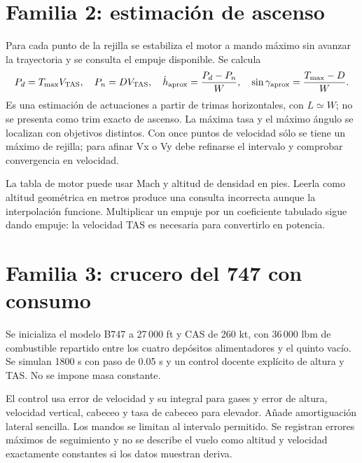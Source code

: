 \section{Familia 2: estimación de ascenso}
Para cada punto de la rejilla se estabiliza el motor a mando máximo sin avanzar la trayectoria y se consulta el empuje disponible. Se calcula
\begin{equation}
P_d=T_{\max}V_{\rm TAS},\quad P_n=DV_{\rm TAS},\quad
\dot h_{\rm aprox}=\frac{P_d-P_n}{W},\quad
\sin\gamma_{\rm aprox}=\frac{T_{\max}-D}{W}.
\end{equation}
Es una estimación de actuaciones a partir de trimas horizontales, con $L\simeq W$; no se presenta como trim exacto de ascenso. La máxima tasa y el máximo ángulo se localizan con objetivos distintos. Con once puntos de velocidad sólo se tiene un máximo de rejilla; para afinar Vx o Vy debe refinarse el intervalo y comprobar convergencia en velocidad.


La tabla de motor puede usar Mach y altitud de densidad en pies. Leerla como altitud geométrica en metros produce una consulta incorrecta aunque la interpolación funcione. Multiplicar un empuje por un coeficiente tabulado sigue dando empuje: la velocidad TAS es necesaria para convertirlo en potencia.

\section{Familia 3: crucero del 747 con consumo}
Se inicializa el modelo B747 a 27\,000 ft y CAS de 260 kt, con 36\,000 lbm de combustible repartido entre los cuatro depósitos alimentadores y el quinto vacío. Se simulan 1800 s con paso de 0.05 s y un control docente explícito de altura y TAS. No se impone masa constante.

El control usa error de velocidad y su integral para gases y error de altura, velocidad vertical, cabeceo y tasa de cabeceo para elevador. Añade amortiguación lateral sencilla. Los mandos se limitan al intervalo permitido. Se registran errores máximos de seguimiento y no se describe el vuelo como altitud y velocidad exactamente constantes si los datos muestran deriva.


